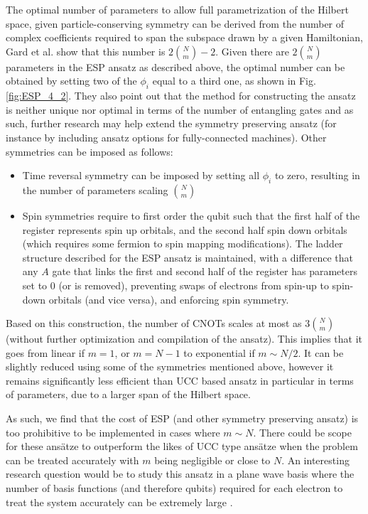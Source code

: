 The optimal number of parameters to allow full parametrization of the Hilbert space, given particle-conserving symmetry can be derived from the number of complex coefficients required to span the subspace drawn by a given Hamiltonian, Gard et al. \cite{Gard2020} show that this number is $2\binom{N}{m} - 2$. Given there are $2\binom{N}{m}$ parameters in the ESP ansatz as described above, the optimal number can be obtained by setting two of the $\phi_i$ equal to a third one, as shown in Fig. \ref{fig:ESP_4_2}. They also point out that the method for constructing the ansatz is neither unique nor optimal in terms of the number of entangling gates and as such, further research may help extend the symmetry preserving ansatz (for instance by including ansatz options for fully-connected machines). Other symmetries can be imposed as follows:
\begin{itemize}
    \item Time reversal symmetry can be imposed by setting all $\phi_i$ to zero, resulting in the number of parameters scaling $\binom{N}{m}$
    \item Spin symmetries require to first order the qubit such that the first half of the register represents spin up orbitals, and the second half spin down orbitals (which requires some fermion to spin mapping modifications). The ladder structure described for the ESP ansatz is maintained, with a difference that any $A$ gate that links the first and second half of the register has parameters set to $0$ (or is removed), preventing swaps of electrons from spin-up to spin-down orbitals (and vice versa), and enforcing spin symmetry.
\end{itemize}

Based on this construction, the number of CNOTs scales at most as $3\binom{N}{m}$(without further optimization and compilation of the ansatz). This implies that it goes from linear if $m=1$, or $m=N-1$ to exponential if $m \sim N/2$. It can be slightly reduced using some of the symmetries mentioned above, however it remains significantly less efficient than UCC based ansatz in particular in terms of parameters, due to a larger span of the Hilbert space.

As such, we find that the cost of ESP (and other symmetry preserving ansatz) is too prohibitive to be implemented in cases where $m \sim N$. There could be scope for these ans{\"{a}}tze to outperform the likes of UCC type ans{\"{a}}tze when the problem can be treated accurately with $m$ being negligible or close to $N$. An interesting research question would be to study this ansatz in a plane wave basis where the number of basis functions (and therefore qubits) required for each electron to treat the system accurately can be extremely large \cite{Babbush2018}.

